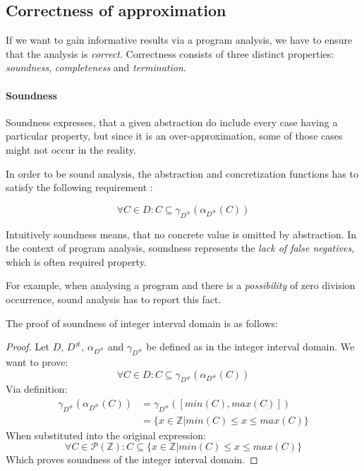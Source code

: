 \documentclass[12pt,oneside]{fithesis2}
\theoremstyle{definition}
\begin{document}
\subsection{Correctness of approximation}\label{ssec:soundness-incompleteness}

If we want to gain informative results via a program analysis, we have to ensure that the analysis is \textit{correct}. Correctness consists of three distinct properties: \textit{soundness}, \textit{completeness} and \textit{termination}.

\paragraph{Soundness}
Soundness expresses, that a given abstraction do include every case having a particular property, but since it is an over-approximation, some of those cases might not occur in the reality.

In order to be sound analysis, the abstraction and concretization functions has to satisfy the following requirement \cite{mine-AIAA10}:

\[
  \forall C \in D: C \subseteq \gamma_{D^\#}(\alpha_{D^\#}(C))
\]

Intuitively soundness means, that no concrete value is omitted by abstraction. In the context of program analysis, soundness represents the \textit{lack of false negatives}, which is often required property.

For example, when analysing a program and there is a \textit{possibility} of zero division occurrence, sound analysis has to report this fact.

The proof of soundness of integer interval domain is as follows:

\begin{proof}
  Let $D$, $D^\#$, $\alpha_{D^\#}$ and $\gamma_{D^\#}$ be defined as in the integer interval domain. We want to prove:
  \[
    \forall C \in D: C \subseteq \gamma_{D^\#}(\alpha_{D^\#}(C))
  \]
  Via definition:
  \begin{align*}
    \gamma_{D^\#}(\alpha_{D^\#}(C)) &= \gamma_{D^\#}([min(C), max(C)])\\
    &= \{ x \in \mathbb Z | min(C) \le x \le max(C) \}
  \end{align*}
  When substituted into the original expression:
  \[
    \forall C \in \mathcal P(\mathbb Z): C \subseteq \{ x \in \mathbb Z | min(C) \le x \le max(C) \}
  \]
  Which proves soundness of the integer interval domain.
\end{proof}
\end{document}
